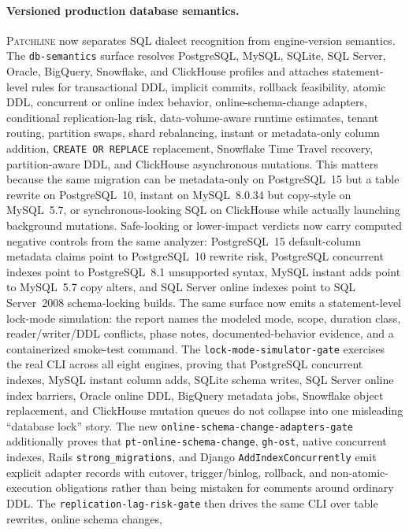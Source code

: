 \documentclass[11pt]{article}
\newcommand{\tool}{\textsc{Patchline}}
\newcommand{\code}[1]{\texttt{#1}}
\begin{document}
\paragraph{Versioned production database semantics.}
\tool{} now separates SQL dialect recognition from engine-version semantics. The \code{db-semantics}
surface resolves PostgreSQL, MySQL, SQLite, SQL Server, Oracle, BigQuery, Snowflake, and ClickHouse
profiles and attaches statement-level rules for transactional DDL, implicit commits, rollback feasibility, atomic DDL,
concurrent or online index behavior, online-schema-change adapters, conditional replication-lag risk,
data-volume-aware runtime estimates, tenant routing, partition swaps, shard rebalancing,
instant or metadata-only column addition, \code{CREATE OR REPLACE}
replacement, Snowflake Time Travel recovery, partition-aware DDL, and ClickHouse asynchronous
mutations. This matters because the same migration can be metadata-only on PostgreSQL~15 but a table
rewrite on PostgreSQL~10, instant on MySQL~8.0.34 but copy-style on MySQL~5.7, or synchronous-looking
SQL on ClickHouse while actually launching background mutations. Safe-looking or lower-impact
verdicts now carry computed negative controls from the same analyzer: PostgreSQL~15 default-column
metadata claims point to PostgreSQL~10 rewrite risk, PostgreSQL concurrent indexes point to
PostgreSQL~8.1 unsupported syntax, MySQL instant adds point to MySQL~5.7 copy alters, and SQL
Server online indexes point to SQL Server~2008 schema-locking builds. The same surface now emits a
statement-level lock-mode simulation: the report names the modeled mode, scope, duration class,
reader/writer/DDL conflicts, phase notes, documented-behavior evidence, and a containerized smoke-test
command. The \code{lock-mode-simulator-gate} exercises the real CLI across all eight engines, proving
that PostgreSQL concurrent indexes, MySQL instant column adds, SQLite schema writes, SQL Server online
index barriers, Oracle online DDL, BigQuery metadata jobs, Snowflake object replacement, and ClickHouse
mutation queues do not collapse into one misleading ``database lock'' story. The new
\code{online-schema-change-adapters-gate} additionally proves that \code{pt-online-schema-change},
\code{gh-ost}, native concurrent indexes, Rails \code{strong\_migrations}, and Django
\code{AddIndexConcurrently} emit explicit adapter records with cutover, trigger/binlog, rollback, and
non-atomic-execution obligations rather than being mistaken for comments around ordinary DDL. The
\code{replication-lag-risk-gate} then drives the same CLI over table rewrites, online schema changes,
\end{document}
